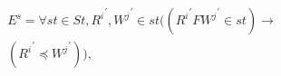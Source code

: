 \documentclass{sig-alternate-05-2015}
\begin{document}
 \begin{align}\label{eqn:WFR}
\begin{split}
E^{s} =  \forall \mathit{st} \in \mathit{St}, {R^i}^{'}, {W^j}^{'} \in \mathit{st} \big( \left( {R^i}^{'} F {W^j }^{'} \in \mathit{st} \right)
 \rightarrow \\ \left(  {R^i}^{'} \preccurlyeq {W^j}^{'} \right) \big), %

\end{split}
\end{align}
\end{document}
